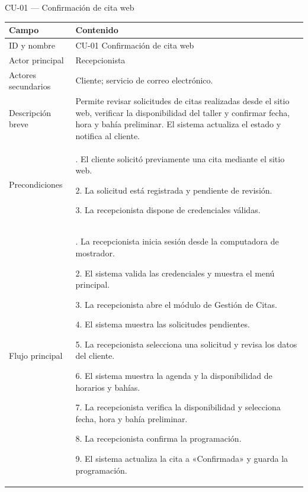 CU-01 --- Confirmación de cita web

{\def\LTcaptype{none} %
\begin{longtable}[]{@{}
  >{\raggedright\arraybackslash}p{}
  >{\raggedright\arraybackslash}p{}@{}}
\toprule\noalign{}
\begin{minipage}[b]{\linewidth}\raggedright
Campo
\end{minipage} & \begin{minipage}[b]{\linewidth}\raggedright
Contenido
\end{minipage} \\
\midrule\noalign{}
\endhead
\bottomrule\noalign{}
\endlastfoot
ID y nombre & CU-01 Confirmación de cita web \\
Actor principal & Recepcionista \\
Actores secundarios & Cliente; servicio de correo electrónico. \\
Descripción breve & Permite revisar solicitudes de citas realizadas
desde el sitio web, verificar la disponibilidad del taller y confirmar
fecha, hora y bahía preliminar. El sistema actualiza el estado y
notifica al cliente. \\
Precondiciones & 1. El cliente solicitó previamente una cita mediante el
sitio web.

2. La solicitud está registrada y pendiente de revisión.

3. La recepcionista dispone de credenciales válidas. \\
Flujo principal & 1. La recepcionista inicia sesión desde la computadora
de mostrador.

2. El sistema valida las credenciales y muestra el menú principal.

3. La recepcionista abre el módulo de Gestión de Citas.

4. El sistema muestra las solicitudes pendientes.

5. La recepcionista selecciona una solicitud y revisa los datos del
cliente.

6. El sistema muestra la agenda y la disponibilidad de horarios y
bahías.

7. La recepcionista verifica la disponibilidad y selecciona fecha, hora
y bahía preliminar.

8. La recepcionista confirma la programación.

9. El sistema actualiza la cita a «Confirmada» y guarda la programación.


\end{longtable}}
